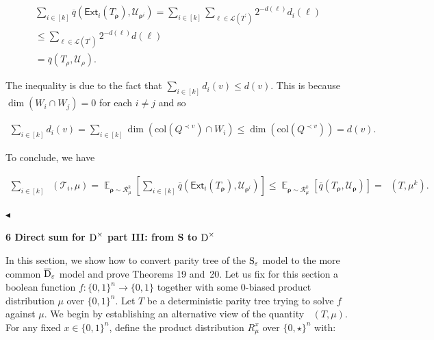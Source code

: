 \documentclass[10pt,a4paper]{article}
\begin{document}
\[\begin{gathered}
\displaystyle\sum\nolimits_{i\in[k]}\overline{q}\left(\mathsf{Ext}_{i}\mathopen{}\left(T_{\bm{\rho}}\mathclose{}\right),\mathcal{U}_{\bm{\rho}^{i}}\right) \displaystyle=\sum_{i\in[k]}\sum_{\ell\in\mathcal{L}(T^{\prime})}2^{-d(\ell)}d_{i}(\ell) \\
\displaystyle\leq\sum_{\ell\in\mathcal{L}(T^{\prime})}2^{-d(\ell)}d(\ell) \\
\displaystyle=\overline{q}(T_{\rho},\mathcal{U}_{\rho}).
\end{gathered}\]


The inequality is due to the fact that $\sum_{i\in[k]}d_{i}(v)\leq d(v)$. This is because $\dim(W_{i}\cap W_{j})=0$ for each $i\neq j$ and so\par


\[\begin{gathered}
\sum\nolimits_{i\in[k]}d_{i}(v)=\sum\nolimits_{i\in[k]}\dim(\mathrm{col}(Q^{\prec v})\cap W_{i})\leq\dim(\mathrm{col}(Q^{\prec v}))=d(v).
\end{gathered}\]


To conclude, we have\par


\[\begin{gathered}
\sum\nolimits_{i\in[k]}\mathop{\overline{sq}}(\mathcal{T}_{i},\mu)=\mathop{\mathbb{E}}_{\bm{\rho}\sim\mathcal{R}_{\mu}^{k}}\left[\sum\nolimits_{i\in[k]}\overline{q}\left(\mathsf{Ext}_{i}\mathopen{}\left(T_{\bm{\rho}}\mathclose{}\right),\mathcal{U}_{\bm{\rho}^{i}}\right)\right]\leq\mathop{\mathbb{E}}_{\bm{\rho}\sim\mathcal{R}_{\mu}^{k}}\left[\overline{q}(T_{\bm{\rho}},\mathcal{U}_{\bm{\rho}})\right]=\mathop{\overline{sq}}(T,\mu^{k}).\
\end{gathered}\]


$\blacktriangleleft$\par







\par\medskip\noindent\textbf{
6 Direct sum for ${\textup{D}}^{\times}$ part III: from S to ${\textup{D}}^{\times}$
}\par




In this section, we show how to convert parity tree of the ${\textup{S}}_{\varepsilon}$ model to the more common $\overline{{\textup{D}}}_{\varepsilon}$ model and prove Theorems 19 and 20. Let us fix for this section a boolean function $f\colon\{0,1\}^{n}\to\{0,1\}$ together with some $0$-biased product distribution $\mu$ over $\{0,1\}^{n}$. Let $T$ be a deterministic parity tree trying to solve $f$ against $\mu$. We begin by establishing an alternative view of the quantity $\mathop{\overline{sq}}(T,\mu)$. For any fixed $x\in\{0,1\}^{n}$, define the product distribution $R_{\mu}^{x}$ over $\{0,\star\}^{n}$ with:\par
\end{document}
